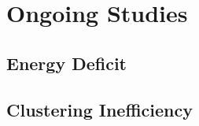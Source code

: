 \section{Ongoing Studies}
\label{sec:ongoing}

\subsection{Energy Deficit}
\label{sec:energy_deficit}

\subsection{Clustering Inefficiency}
\label{sec:clustering_ineff}




